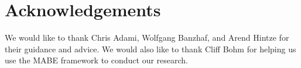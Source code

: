\section{Acknowledgements}
We would like to thank Chris Adami, Wolfgang Banzhaf, and Arend Hintze for their guidance and advice. We would also like to thank Cliff Bohm for helping us use the MABE framework to conduct our research.
